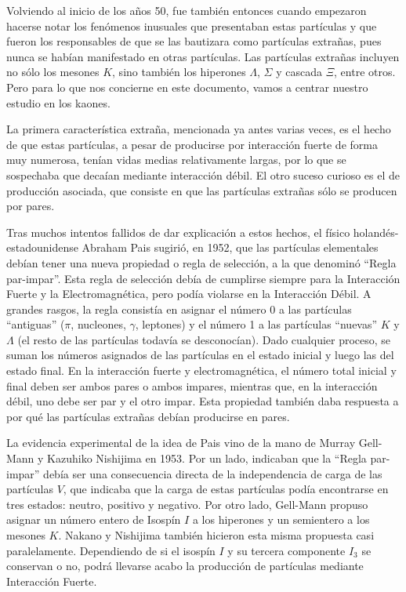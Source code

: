 Volviendo al inicio de los años 50, fue también entonces cuando empezaron hacerse notar los fenómenos inusuales que presentaban estas partículas y que fueron los responsables de que se las bautizara como partículas extrañas, pues nunca se habían manifestado en otras partículas. Las partículas extrañas incluyen no sólo los mesones $K$, sino también los hiperones $\Lambda$, $\Sigma$ y cascada $\Xi$, entre otros. Pero para lo que nos concierne en este documento, vamos a centrar nuestro estudio en los kaones.

La primera característica extraña, mencionada ya antes varias veces, es el hecho de que estas partículas, a pesar de producirse por interacción fuerte de forma muy numerosa, tenían vidas medias relativamente largas, por lo que se sospechaba que decaían mediante interacción débil. El otro suceso curioso es el de producción asociada, que consiste en que las partículas extrañas sólo se producen por pares.  

Tras muchos intentos fallidos de dar explicación a estos hechos, el físico holandés-estadounidense Abraham Pais sugirió, en 1952, que las partículas elementales debían tener una nueva propiedad o regla de selección, a la que denominó ``Regla par-impar''. Esta regla de selección debía de cumplirse siempre para la Interacción Fuerte y la Electromagnética, pero podía violarse en la Interacción Débil. A grandes rasgos, la regla consistía en asignar el número 0 a las partículas ``antiguas'' ($\pi$, nucleones, $\gamma$, leptones) y el número 1 a las partículas ``nuevas'' $K$ y $\Lambda$ (el resto de las partículas todavía se desconocían). Dado cualquier proceso, se suman los números asignados de las partículas en el estado inicial y luego las del estado final. En la interacción fuerte y electromagnética, el número total inicial y final deben ser ambos pares o ambos impares, mientras que, en la interacción débil, uno debe ser par y el otro impar. Esta propiedad también daba respuesta a por qué las partículas extrañas debían producirse en pares. \cite{Pais}

La evidencia experimental de la idea de Pais vino de la mano de Murray Gell-Mann y Kazuhiko Nishijima en 1953. Por un lado, indicaban que la ``Regla par-impar'' debía ser una consecuencia directa de la independencia de carga de las partículas $V$, que indicaba que la carga de estas partículas podía encontrarse en tres estados: neutro, positivo y negativo. Por otro lado, Gell-Mann propuso asignar un número entero de Isospín $I$ a los hiperones y un semientero a los mesones $K$. Nakano y Nishijima también hicieron esta misma propuesta casi paralelamente. Dependiendo de si el isospín $I$ y su tercera componente $I_3$ se conservan o no, podrá llevarse acabo la producción de partículas mediante Interacción Fuerte. \cite{nakano}

